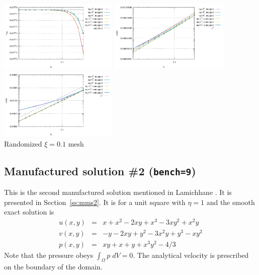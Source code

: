 \begin{center}
\includegraphics[width=5.7cm]{python_codes/fieldstone_76/results/mms1/rand/vrms}
\includegraphics[width=5.7cm]{python_codes/fieldstone_76/results/mms1/rand/errors_V}
\includegraphics[width=5.7cm]{python_codes/fieldstone_76/results/mms1/rand/errors_P}\\
{\captionfont Randomized $\xi=0.1$ mesh}
\end{center}

\subsection*{Manufactured solution \#2 ({\tt bench=9})}

This is the second manufactured solution 
mentioned in Lamichhane \cite{lami17}. It is presented in Section~\ref{ss:mms2}.
It is for a unit square with $\eta=1$ and the smooth exact solution is
\begin{eqnarray}
u(x,y) &=& x+x^2 - 2xy+x^3 - 3xy^2 + x^2y \\
v(x,y) &=& -y-2xy+y^2 -3x^2y + y^3 - xy^2 \\
p(x,y) &=& xy+x+y+x^3y^2 - 4/3
\end{eqnarray}
Note that the pressure obeys $\int_{\Omega} p \; dV = 0$. The analytical 
velocity is prescribed on the boundary of the domain. 


